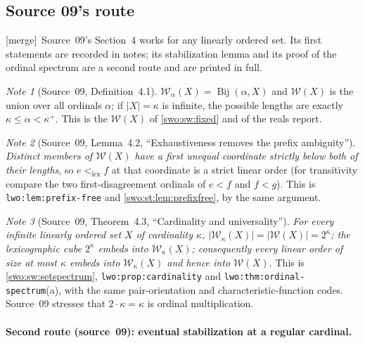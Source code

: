 \documentclass[11pt]{article}
\theoremstyle{definition}
\theoremstyle{remark}
\newtheorem{note}[note]{Note}
\newcommand{\WO}{\mathcal W}
\newcommand{\lex}{\mathrm{lex}}
\newcommand{\Bij}{\operatorname{Bij}}
\newcommand{\card}[1]{\lvert #1\rvert}
\newcommand{\code}[1]{\texttt{\small #1}}
\newcommand{\merge}{\textsf{[merge]}}
\begin{document}

\subsection{Source 09's route}\label{swo:ec:sec:setcase}

\merge\ Source~09's Section~4 works for any linearly ordered set. Its first
statements are recorded in notes; its stabilization lemma and its proof of the
ordinal spectrum are a second route and are printed in full.

\begin{note}[Source~09, Definition~4.1]\label{swo:ec:n4.1}
$\WO_\alpha(X)=\Bij(\alpha,X)$ and $\WO(X)$ is the union over all ordinals
$\alpha$; if $\card X=\kappa$ is infinite, the possible lengths are exactly
$\kappa\le\alpha<\kappa^+$. This is the $\WO(X)$ of \cref{swo:sw:fixed} and of
the reals report.
\end{note}

\begin{note}[Source~09, Lemma~4.2, ``Exhaustiveness removes the prefix ambiguity'']\label{swo:ec:lem:prefixfree}
\emph{Distinct members of $\WO(X)$ have a first unequal coordinate strictly
below both of their lengths}, so $e<_\lex f$ at that coordinate is a strict
linear order (for transitivity compare the two first-disagreement ordinals of
$e<f$ and $f<g$). This is \code{lwo:lem:prefix-free} and
\cref{swo:st:lem:prefixfree}, by the same argument.
\end{note}

\begin{note}[Source~09, Theorem~4.3, ``Cardinality and universality'']\label{swo:ec:thm:set-universal}
\emph{For every infinite linearly ordered set $X$ of cardinality $\kappa$,
$\card{\WO_\kappa(X)}=\card{\WO(X)}=2^\kappa$; the lexicographic cube
$2^\kappa$ embeds into $\WO_\kappa(X)$; consequently every linear order of size
at most $\kappa$ embeds into $\WO_\kappa(X)$ and hence into $\WO(X)$.} This is
\cref{swo:sw:setspectrum}, \code{lwo:prop:cardinality} and
\code{lwo:thm:ordinal-spectrum}(a), with the same pair-orientation and
characteristic-function codes. Source~09 stresses that $2\cdot\kappa=\kappa$
is ordinal multiplication.
\end{note}

\paragraph{Second route (source~09): eventual stabilization at a regular cardinal.}
\end{document}
